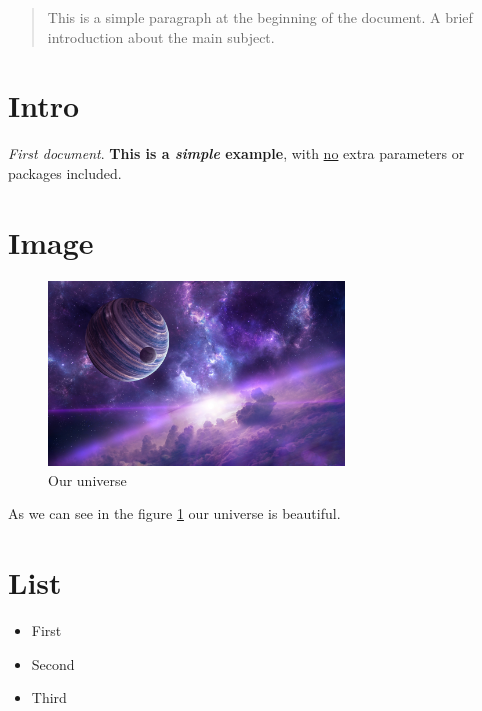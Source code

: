 \documentclass[12pt, letterpaper]{article}
\begin{document}
\maketitle

\begin{abstract}
    This is a simple paragraph at the beginning of the 
    document. A brief introduction about the main subject.
\end{abstract}

\newpage

\tableofcontents  

\newpage

\section{Intro}

\textit{First document}. \textbf{This is a \textit{simple} example}, with \underline{no} 
extra parameters or packages included.

\section{Image}

\begin{figure}[h]
    \centering
    \includegraphics[width=0.70\textwidth]{universe.jpg}
    \caption{Our universe}
    \label{fig:universe}
\end{figure}

As we can see in the figure \ref{fig:universe} our universe is beautiful.

\section{List}

\begin{itemize}
    \item First 
    \item Second
    \item Third
\end{itemize}
\end{document}
